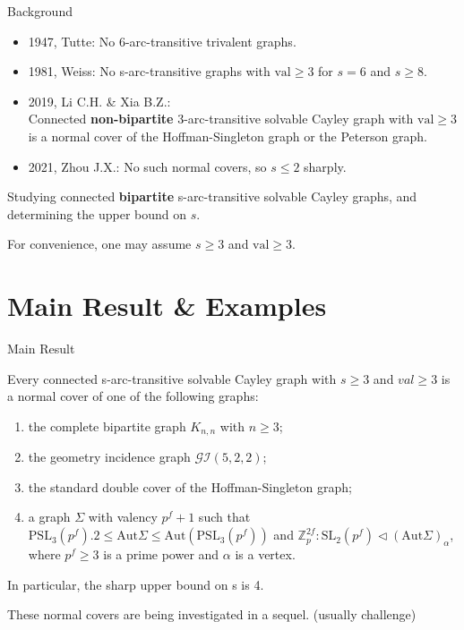 \documentclass{beamer}
\def\SL{\mathrm{SL}}
\def\PSL{\mathrm{PSL}}
\def\Aut{\mathrm{Aut}}
\def\val{\mathrm{val}}
\begin{document}
\begin{frame}{Background}
\begin{itemize}
	\item 1947, Tutte: No 6-arc-transitive trivalent graphs.
	\item 1981, Weiss: No s-arc-transitive graphs with $\val\geq 3$ for $s=6$ and $s\geq 8$.
	\item 2019, Li C.H. \& Xia B.Z.: \\ Connected \textbf{non-bipartite} 3-arc-transitive solvable Cayley graph with $\val\geq 3$ is a normal cover of the Hoffman-Singleton graph or the Peterson graph.
	\item 2021, Zhou J.X.: No such normal covers, so $s\leq 2$ sharply.
\end{itemize}

\begin{problem}
Studying connected \textbf{bipartite} s-arc-transitive solvable Cayley graphs, and determining the upper bound on $s$.	
\end{problem}
For convenience, one may assume $s\geq 3$ and $\val\geq 3$. 

\end{frame}




\section{Main Result \& Examples}
\begin{frame}{Main Result}
\begin{theorem}
Every connected s-arc-transitive solvable Cayley graph with $s\geq 3$ and $val\geq 3$ is a normal cover of one of the following graphs:	
\begin{enumerate}
	\item the complete bipartite graph $K_{n,n}$ with $n\geq 3$;
	\item the geometry incidence graph $\mathcal{GI}(5, 2, 2)$;
	\item the standard double cover of the Hoffman-Singleton graph;
	\item a graph $\Sigma$ with valency $p^f+1$ such that $\PSL_3(p^f).2\leq \Aut\Sigma\leq \Aut(\PSL_3(p^f))$ and $\mathbb{Z}_p^{2f}:\SL_2(p^f)\triangleleft(\Aut\Sigma)_\alpha$, where $p^f\geq 3$ is a prime power and $\alpha$ is a vertex.
\end{enumerate}
In particular, the sharp upper bound on s is 4.
\end{theorem}
These normal covers are being investigated in a sequel. (usually challenge)
\end{frame}
\end{document}

